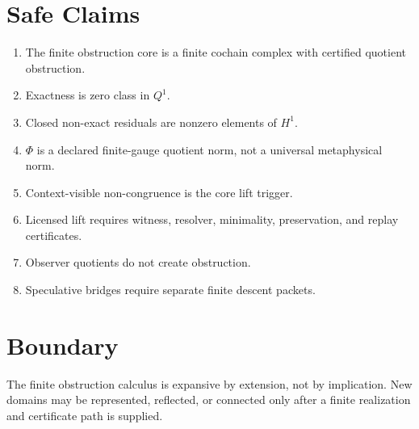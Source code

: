\documentclass[11pt]{article}
\theoremstyle{definition}
\begin{document}
\section{Safe Claims}

\begin{enumerate}
    \item The finite obstruction core is a finite cochain complex with certified quotient obstruction.
    \item Exactness is zero class in \(Q^1\).
    \item Closed non-exact residuals are nonzero elements of \(H^1\).
    \item \(\Phi\) is a declared finite-gauge quotient norm, not a universal metaphysical norm.
    \item Context-visible non-congruence is the core lift trigger.
    \item Licensed lift requires witness, resolver, minimality, preservation, and replay certificates.
    \item Observer quotients do not create obstruction.
    \item Speculative bridges require separate finite descent packets.
\end{enumerate}

\section{Boundary}

The finite obstruction calculus is expansive by extension, not by implication. New domains may be represented, reflected, or connected only after a finite realization and certificate path is supplied.
\end{document}
